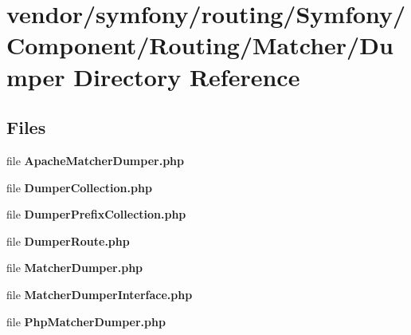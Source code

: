 \section{vendor/symfony/routing/\+Symfony/\+Component/\+Routing/\+Matcher/\+Dumper Directory Reference}
\label{dir_85e8d20a7b6ace7037c22d6ed001dcea}
\subsection*{Files}
\begin{DoxyCompactItemize}
\item 
file {\bf Apache\+Matcher\+Dumper.\+php}
\item 
file {\bf Dumper\+Collection.\+php}
\item 
file {\bf Dumper\+Prefix\+Collection.\+php}
\item 
file {\bf Dumper\+Route.\+php}
\item 
file {\bf Matcher\+Dumper.\+php}
\item 
file {\bf Matcher\+Dumper\+Interface.\+php}
\item 
file {\bf Php\+Matcher\+Dumper.\+php}
\end{DoxyCompactItemize}
